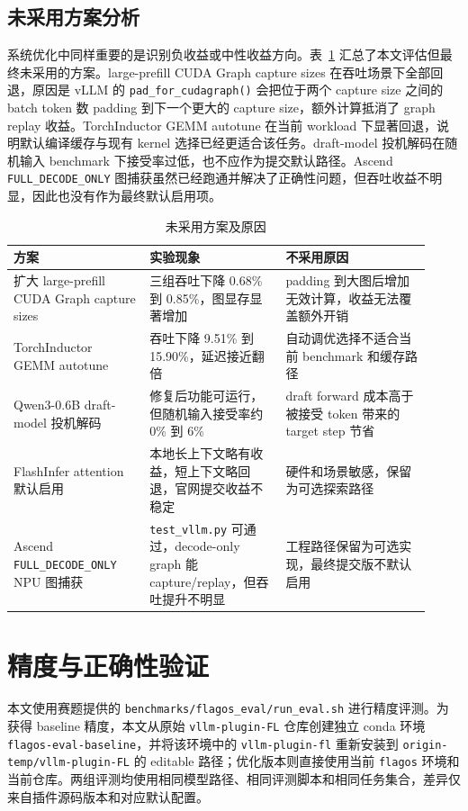 \documentclass[UTF8,10.5pt]{ctexart}
\newcommand{\code}[1]{\texttt{#1}}
\begin{document}
\subsection{未采用方案分析}

系统优化中同样重要的是识别负收益或中性收益方向。表~\ref{tab:negative-results} 汇总了本文评估但最终未采用的方案。large-prefill CUDA Graph capture sizes 在吞吐场景下全部回退，原因是 vLLM 的 \code{pad\_for\_cudagraph()} 会把位于两个 capture size 之间的 batch token 数 padding 到下一个更大的 capture size，额外计算抵消了 graph replay 收益。TorchInductor GEMM autotune 在当前 workload 下显著回退，说明默认编译缓存与现有 kernel 选择已经更适合该任务。draft-model 投机解码在随机输入 benchmark 下接受率过低，也不应作为提交默认路径。Ascend \code{FULL\_DECODE\_ONLY} 图捕获虽然已经跑通并解决了正确性问题，但吞吐收益不明显，因此也没有作为最终默认启用项。

\begin{table}[H]
\centering
\caption{未采用方案及原因}
\label{tab:negative-results}
\begin{tabular}{p{0.30\linewidth}p{0.30\linewidth}p{0.32\linewidth}}
\toprule
方案 & 实验现象 & 不采用原因 \\
\midrule
扩大 large-prefill CUDA Graph capture sizes & 三组吞吐下降 0.68\% 到 0.85\%，图显存显著增加 & padding 到大图后增加无效计算，收益无法覆盖额外开销 \\
TorchInductor GEMM autotune & 吞吐下降 9.51\% 到 15.90\%，延迟接近翻倍 & 自动调优选择不适合当前 benchmark 和缓存路径 \\
Qwen3-0.6B draft-model 投机解码 & 修复后功能可运行，但随机输入接受率约 0\% 到 6\% & draft forward 成本高于被接受 token 带来的 target step 节省 \\
FlashInfer attention 默认启用 & 本地长上下文略有收益，短上下文略回退，官网提交收益不稳定 & 硬件和场景敏感，保留为可选探索路径 \\
Ascend \code{FULL\_DECODE\_ONLY} NPU 图捕获 & \code{test\_vllm.py} 可通过，decode-only graph 能 capture/replay，但吞吐提升不明显 & 工程路径保留为可选实现，最终提交版不默认启用 \\
\bottomrule
\end{tabular}
\end{table}

\section{精度与正确性验证}

本文使用赛题提供的 \code{benchmarks/flagos\_eval/run\_eval.sh} 进行精度评测。为获得 baseline 精度，本文从原始 \code{vllm-plugin-FL} 仓库创建独立 conda 环境 \code{flagos-eval-baseline}，并将该环境中的 \code{vllm-plugin-fl} 重新安装到 \code{origin-temp/vllm-plugin-FL} 的 editable 路径；优化版本则直接使用当前 \code{flagos} 环境和当前仓库。两组评测均使用相同模型路径、相同评测脚本和相同任务集合，差异仅来自插件源码版本和对应默认配置。
\end{document}
